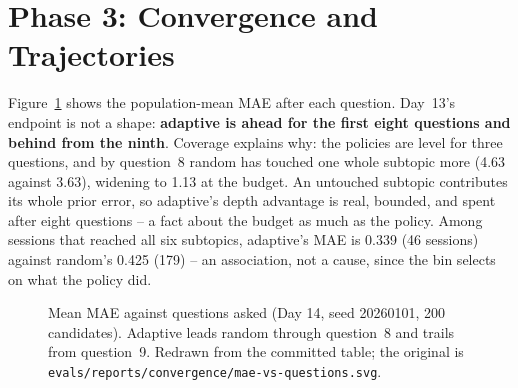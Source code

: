 \documentclass{tietreport}
\begin{document}
\section{Phase 3: Convergence and Trajectories}
\label{sec:convergence-results}

Figure~\ref{fig:mae-curve} shows the population-mean MAE after each question. Day~13's endpoint
is not a shape: \textbf{adaptive is ahead for the first eight questions and behind from the
ninth}. Coverage explains why: the policies are level for three questions, and by question~8
random has touched one whole subtopic more (4.63 against 3.63), widening to 1.13 at the budget.
An untouched subtopic contributes its whole prior error, so adaptive's depth advantage is real,
bounded, and spent after eight questions -- a fact about the budget as much as the policy. Among
sessions that reached all six subtopics, adaptive's MAE is 0.339 (46 sessions) against random's
0.425 (179) -- an association, not a cause, since the bin selects on what the policy did.

\begin{figure}[htbp]
\centering
{}
\caption{Mean MAE against questions asked (Day 14, seed 20260101, 200 candidates). Adaptive leads random through question~8 and trails from question~9. Redrawn from the committed table; the original is \texttt{evals/reports/convergence/mae-vs-questions.svg}.}
\label{fig:mae-curve}
\end{figure}
\end{document}
